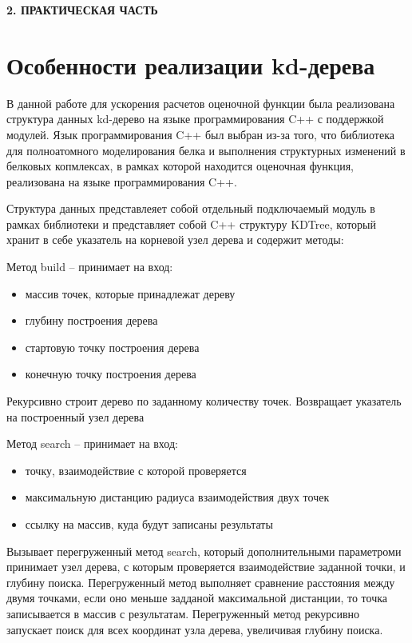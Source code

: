 \newpage
\begin{center}
  \textbf{\large 2. ПРАКТИЧЕСКАЯ ЧАСТЬ}
\end{center}

\section{Особенности реализации kd-дерева}


В данной работе для ускорения расчетов оценочной функции была реализована структура данных kd-дерево на языке программирования C++ с поддержкой модулей. Язык программирования C++ был выбран из-за того, что библиотека для полноатомного моделирования белка и выполнения структурных изменений в белковых копмлексах, в рамках которой находится оценочная функция, реализована на языке программирования C++.

Структура данных представлеяет собой отдельный подключаемый модуль в рамках библиотеки и представляет собой C++ структуру KDTree, который хранит в себе указатель на корневой узел дерева и содержит методы:

Метод build -- принимает на вход:

\begin{itemize}
	\item массив точек, которые принадлежат дереву
	\item глубину построения дерева
	\item стартовую точку построения дерева
	\item конечную точку построения дерева
\end{itemize}

Рекурсивно строит дерево по заданному количеству точек. Возвращает указатель на построенный узел дерева

Метод search -- принимает на вход:
\begin{itemize}
	\item точку, взаимодействие с которой проверяется
	\item максимальную дистанцию радиуса взаимодействия двух точек
	\item ссылку на массив, куда будут записаны результаты
\end{itemize}

Вызывает перегруженный метод search, который дополнительными параметроми принимает узел дерева, с которым проверяется взаимодействие заданной точки, и глубину поиска. Перегруженный метод выполняет сравнение расстояния между двумя точками, если оно меньше задданой максимальной дистанции, то точка записывается в массив с результатам. Перегруженный метод рекурсивно запускает поиск для всех координат узла дерева, увеличивая глубину поиска.


